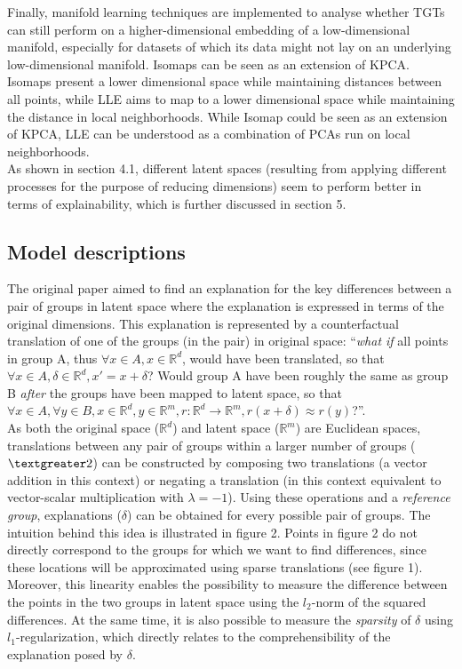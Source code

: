 Finally, manifold learning techniques are implemented to analyse whether TGTs can still perform on a higher-dimensional embedding of a low-dimensional manifold, especially for datasets of which its data might not lay on an underlying low-dimensional manifold. Isomaps can be seen as an extension of KPCA. Isomaps present a lower dimensional space while maintaining distances between all points, while LLE aims to map to a lower dimensional space while maintaining the distance in local neighborhoods. While Isomap could be seen as an extension of KPCA, LLE can be understood as a combination of PCAs run on local neighborhoods.\\

As shown in section 4.1, different latent spaces (resulting from applying different processes for the purpose of reducing dimensions) seem to perform better in terms of explainability, which is further discussed in section 5.


\subsection{Model descriptions}
The original paper aimed to find an explanation for the key differences between a pair of groups in latent space where the explanation is expressed in terms of the original dimensions. This explanation is represented by a counterfactual translation of one of the groups (in the pair) in original space: ``\textit{what if} all points in group A, thus $\forall x \in A, x \in \mathbb{R}^d$, would have been translated, so that $\forall x \in A, \delta \in \mathbb{R}^d, x' = x + \delta$? Would group A have been roughly the same as group B \textit{after} the groups have been mapped to latent space, so that $\forall x \in A, \forall y \in B, x \in \mathbb{R}^d, y \in \mathbb{R}^m, r: \mathbb{R}^d \to \mathbb{R}^m, r(x + \delta) \approx r(y)$?''.\\

As both the original space ($\mathbb{R}^d$) and latent space ($\mathbb{R}^m$) are Euclidean spaces, translations between any pair of groups within a larger number of groups ($\textgreater 2$) can be constructed by composing two translations (a vector addition in this context) or negating a translation (in this context equivalent to vector-scalar multiplication with $\lambda = -1$). Using these operations and a \textit{reference group}, explanations ($\delta$) can be obtained for every possible pair of groups. The intuition behind this idea is illustrated in figure 2. Points in figure 2 do not directly correspond to the groups for which we want to find differences, since these locations will be approximated using sparse translations (see figure 1). Moreover, this linearity enables the possibility to measure the difference between the points in the two groups in latent space using the $l_2$-norm of the squared differences. At the same time, it is also possible to measure the \textit{sparsity} of $\delta$ using $l_1$-regularization, which directly relates to the comprehensibility of the explanation posed by $\delta$.\\


